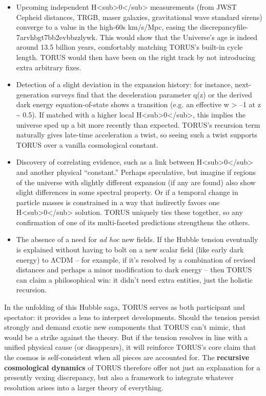 \documentclass[]{article}
\begin{document}
\begin{itemize}
\item
  Upcoming independent
  H\textless{}sub\textgreater{}0\textless{}/sub\textgreater{}
  measurements (from JWST Cepheid distances, TRGB, maser galaxies,
  gravitational wave standard sirens) converge to a value in the
  high-60s km/s/Mpc, easing the discrepancy​file-7arvhbgt7bb2evbbzzlywk.
  This would show that the Universe's age is indeed around 13.5 billion
  years, comfortably matching TORUS's built-in cycle length. TORUS would
  then have been on the right track by not introducing extra arbitrary
  fixes.
\item
  Detection of a slight deviation in the expansion history: for
  instance, next-generation surveys find that the deceleration parameter
  q(z) or the derived dark energy equation-of-state shows a transition
  (e.g. an effective w \textgreater{} --1 at z \textasciitilde{} 0.5).
  If matched with a higher local
  H\textless{}sub\textgreater{}0\textless{}/sub\textgreater{}, this
  implies the universe sped up a bit more recently than expected.
  TORUS's recursion term naturally gives late-time acceleration a twist,
  so seeing such a twist supports TORUS over a vanilla cosmological
  constant.
\item
  Discovery of correlating evidence, such as a link between
  H\textless{}sub\textgreater{}0\textless{}/sub\textgreater{} and
  another physical ``constant.'' Perhaps speculative, but imagine if
  regions of the universe with slightly different expansion (if any are
  found) also show slight differences in some spectral property. Or if a
  temporal change in particle masses is constrained in a way that
  indirectly favors one
  H\textless{}sub\textgreater{}0\textless{}/sub\textgreater{} solution.
  TORUS uniquely ties these together, so any confirmation of one of its
  multi-faceted predictions strengthens the others.
\item
  The absence of a need for \emph{ad hoc} new fields. If the Hubble
  tension eventually is explained without having to bolt on a new scalar
  field (like early dark energy) to ΛCDM -- for example, if it's
  resolved by a combination of revised distances and perhaps a minor
  modification to dark energy -- then TORUS can claim a philosophical
  win: it didn't need extra entities, just the holistic recursion.
\end{itemize}

In the unfolding of this Hubble saga, TORUS serves as both participant
and spectator: it provides a lens to interpret developments. Should the
tension persist strongly and demand exotic new components that TORUS
can't mimic, that would be a strike against the theory. But if the
tension resolves in line with a unified physical cause (or disappears),
it will reinforce TORUS's core claim that the cosmos is self-consistent
when all pieces are accounted for. The \textbf{recursive cosmological
dynamics} of TORUS therefore offer not just an explanation for a
presently vexing discrepancy, but also a framework to integrate whatever
resolution arises into a larger theory of everything.
\end{document}

